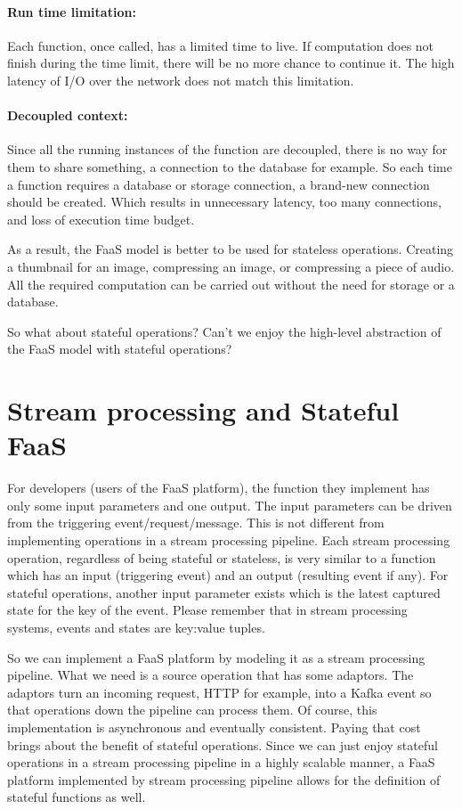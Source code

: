 \documentclass[a4]{report}
\begin{document}
    \paragraph{Run time limitation:} Each function, once called, has a limited time to live.
    If computation does not finish during the time limit, there will be no more chance to continue it.
    The high latency of I/O over the network does not match this limitation.

    \paragraph{Decoupled context:} Since all the running instances of the function are decoupled, there is
    no way for them to share something, a connection to the database for example.
    So each time a function requires a database or storage connection, a brand-new connection should be created.
    Which results in unnecessary latency, too many connections, and loss of execution time budget.

    As a result, the FaaS model is better to be used for stateless operations.
    Creating a thumbnail for an image, compressing an image, or compressing a piece of audio.
    All the required computation can be carried out without the need for storage or a database.

    So what about stateful operations?
    Can't we enjoy the high-level abstraction of the FaaS model with stateful operations?


    \section{Stream processing and Stateful FaaS}
    For developers (users of the FaaS platform), the function they implement has only some input parameters and one output.
    The input parameters can be driven from the triggering event/request/message.
    This is not different from implementing operations in a stream processing pipeline.
    Each stream processing operation, regardless of being stateful or stateless, is very similar to a function which has an input (triggering event) and an output (resulting event if any).
    For stateful operations, another input parameter exists which is the latest captured state for the key of the event.
    Please remember that in stream processing systems, events and states are key:value tuples.

    So we can implement a FaaS platform by modeling it as a stream processing pipeline.
    What we need is a source operation that has some adaptors.
    The adaptors turn an incoming request, HTTP for example, into a Kafka event so that operations down the pipeline can process them.
    Of course, this implementation is asynchronous and eventually consistent.
    Paying that cost brings about the benefit of stateful operations.
    Since we can just enjoy stateful operations in a stream processing pipeline in a highly scalable manner,
    a FaaS platform implemented by stream processing pipeline allows for the definition of stateful functions as well.
\end{document}
